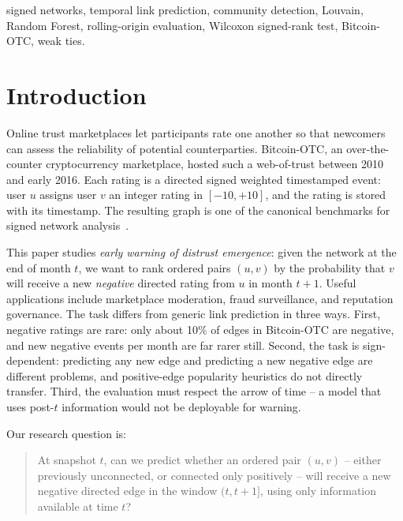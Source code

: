 \documentclass[conference]{IEEEtran}
\begin{document}
\begin{IEEEkeywords}
signed networks, temporal link prediction, community detection,
Louvain, Random Forest, rolling-origin evaluation, Wilcoxon
signed-rank test, Bitcoin-OTC, weak ties.
\end{IEEEkeywords}

\section{Introduction}

Online trust marketplaces let participants rate one another so that
newcomers can assess the reliability of potential counterparties.
Bitcoin-OTC, an over-the-counter cryptocurrency marketplace, hosted
such a web-of-trust between 2010 and early 2016. Each rating is a
directed signed weighted timestamped event: user $u$ assigns user $v$
an integer rating in $[-10, +10]$, and the rating is stored with its
timestamp. The resulting graph is one of the canonical benchmarks for
signed network analysis~\cite{kumar2016}.

This paper studies \emph{early warning of distrust emergence}: given
the network at the end of month $t$, we want to rank ordered pairs
$(u, v)$ by the probability that $v$ will receive a new \emph{negative}
directed rating from $u$ in month $t+1$. Useful applications include
marketplace moderation, fraud surveillance, and reputation governance.
The task differs from generic link prediction in three ways. First,
negative ratings are rare: only about 10\% of edges in Bitcoin-OTC are
negative, and new negative events per month are far rarer still.
Second, the task is sign-dependent: predicting any new edge and
predicting a new negative edge are different problems, and positive-edge
popularity heuristics do not directly transfer. Third, the evaluation
must respect the arrow of time -- a model that uses post-$t$
information would not be deployable for warning.

Our research question is:
\begin{quote}
At snapshot $t$, can we predict whether an ordered pair $(u, v)$ --
either previously unconnected, or connected only positively -- will
receive a new negative directed edge in the window
$(t, t{+}1]$, using only information available at time $t$?
\end{quote}
\end{document}
